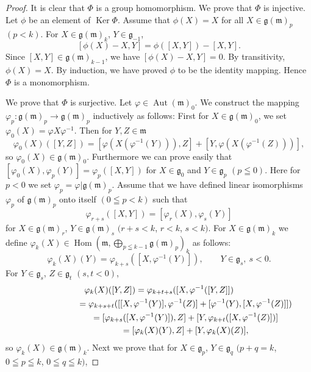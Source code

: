 \documentclass[pdftex]{sigma}
\numberwithin{equation}{section}
\numberwithin{theorem}{section}
\numberwithin{proposition}{section}
\numberwithin{lemma}{section}
\numberwithin{corollary}{section}
\numberwithin{definition}{section}
\numberwithin{example}{section}
\numberwithin{remark}{section}
\numberwithin{note}{section}
\newcommand{\Hom}{\operatorname{Hom}}
\newcommand{\Ker}{\operatorname{Ker}}
\newcommand{\Aut}{\operatorname{Aut}}
\begin{document}
\begin{proof}
It is clear that $\Phi$ is a group homomorphism.
We prove that $\Phi$ is injective.
Let $\phi$ be an element of $\Ker\Phi$.
Assume that $\phi(X)=X$ for all $X\in \mathfrak g(\mathfrak m)_p$ $(p<k)$.
For $X\in\mathfrak g(\mathfrak m)_k$, $Y\in\mathfrak g_{-1}$,
\[
[\phi(X)-X,Y]=\phi([X,Y])-[X,Y].
\]
Since $[X,Y]\in\mathfrak g(\mathfrak m)_{k-1}$, we have $[\phi(X)-X,Y]=0$.
By transitivity, $\phi(X)=X$.
By induction, we have proved $\phi$ to be the identity mapping.
Hence $\Phi$ is a monomorphism.

We prove that $\Phi$ is surjective.
Let $\varphi\in\Aut(\mathfrak m)_0$.
We construct the mapping
$\varphi_p:\mathfrak g(\mathfrak m)_p\to\mathfrak g(\mathfrak m)_p$
inductively as follows:
First for $X\in\mathfrak g(\mathfrak m)_0$, we set
$\varphi_0(X)=\varphi X\varphi^{-1}$.
Then for $Y,Z\in \mathfrak m$
\[
\varphi_0(X)([Y,Z])=[\varphi(X(\varphi^{-1}(Y))),Z]
+[Y,\varphi(X(\varphi^{-1}(Z)))],
\]
so $\varphi_0(X)\in\mathfrak g(\mathfrak m)_0$.
Furthermore we can prove easily that
$[\varphi_0(X),\varphi_p(Y)]=\varphi_p([X,Y])$ for
$X\in\mathfrak g_0$ and $Y\in \mathfrak g_p$ $(p\leqq 0)$.
Here for $p<0$ we set $\varphi_p=\varphi|\mathfrak g(\mathfrak m)_p$.
Assume that we have def\/ined linear isomorphisms $\varphi_p$ of
$\mathfrak g(\mathfrak m)_p$ onto itself $(0\leqq p<k)$ such that
\[
\varphi_{r+s}([X,Y])=[\varphi_r(X),\varphi_s(Y)]
\]
for $X\in\mathfrak g(\mathfrak m)_r$, $Y\in\mathfrak g(\mathfrak m)_s$
$(r+s<k$, $r<k$, $s<k)$.
For $X\in\mathfrak g(\mathfrak m)_k$ we def\/ine $\varphi_k(X)\in
\Hom(\mathfrak m,\bigoplus\limits_{p\leqq k-1}\mathfrak g(\mathfrak m)_p)_k$
as follows:
\[
\varphi_k(X)(Y)=\varphi_{k+s}([X,\varphi^{-1}(Y)]), \qquad Y\in\mathfrak g_s, \ s<0.
\]
For $Y\in\mathfrak g_s$, $Z\in\mathfrak g_t$ $(s,t<0)$,
\begin{gather*}
\varphi_k(X)([Y,Z]) =\varphi_{k+t+s}([X,\varphi^{-1}([Y,Z]]) \\
\hphantom{\varphi_k(X)([Y,Z])}{}
=\varphi_{k+s+t}([[X,\varphi^{-1}(Y)],\varphi^{-1}(Z)]
+[\varphi^{-1}(Y),[X,\varphi^{-1}(Z)]]) \\
\hphantom{\varphi_k(X)([Y,Z])}{}
=[\varphi_{k+s}([X,\varphi^{-1}(Y)]),Z]
+[Y,\varphi_{k+t}([X,\varphi^{-1}(Z)])] \\
\hphantom{\varphi_k(X)([Y,Z])}{}
=[\varphi_k(X)(Y),Z]+[Y,\varphi_k(X)(Z)],
\end{gather*}
so $\varphi_k(X)\in\mathfrak g(\mathfrak m)_k$.
Next we prove that for $X\in\mathfrak g_p$, $Y\in\mathfrak g_q$ $(p+q=k$,
$0\leqq p\leqq k$, $0\leqq q\leqq k)$,

\end{proof}
\end{document}
